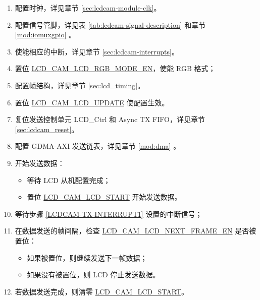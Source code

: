 \documentclass[main\_\_CN.tex]{subfiles}
\begin{document}
\begin{enumerate}
    \item 配置时钟，详见章节 \ref{sec:lcdcam-module-clk}。
    \item 配置信号管脚，详见表 \ref{tab:lcdcam-signal-description} 和章节 \ref{mod:iomuxgpio} \textit{}。

    \item \label{LCDCAM-TX-INTERRUPT1} 使能相应的中断，详见章节 \ref{sec:lcdcam-interrupts}。

    \item 置位 \hyperref[fielddesc:LCDCAMLCDRGBMODEEN]{LCD\_CAM\_LCD\_RGB\_MODE\_EN}，使能 RGB 格式；

    \item 配置帧结构，详见章节 \ref{sec:lcd_timing}。

    \item 置位 \hyperref[fielddesc:LCDCAMLCDUPDATE]{LCD\_CAM\_LCD\_UPDATE} 使配置生效。

    \item 复位发送控制单元 LCD\_Ctrl 和 Async TX FIFO，详见章节 \ref{sec:lcdcam_reset}。

    \item 配置 GDMA-AXI 发送链表，详见章节 \ref{mod:dma} \textit{}。

    \item 开始发送数据：
    \begin{itemize}
        \item 等待 LCD 从机配置完成；
        \item 置位 \hyperref[fielddesc:LCDCAMLCDSTART]{LCD\_CAM\_LCD\_START} 开始发送数据。
    \end{itemize}

    \item 等待步骤 \ref{LCDCAM-TX-INTERRUPT1} 设置的中断信号；

    \item 在数据发送的帧间隔，检查 \hyperref[fielddesc:LCDCAMLCDNEXTFRAMEEN]{LCD\_CAM\_LCD\_NEXT\_FRAME\_EN} 是否被置位：
        \begin{itemize}
        \item 如果被置位，则继续发送下一帧数据；
        \item 如果没有被置位，则 LCD 停止发送数据。
        \end{itemize}

    \item 若数据发送完成，则清零 \hyperref[fielddesc:LCDCAMLCDSTART]{LCD\_CAM\_LCD\_START}。
\end{enumerate}
\end{document}
